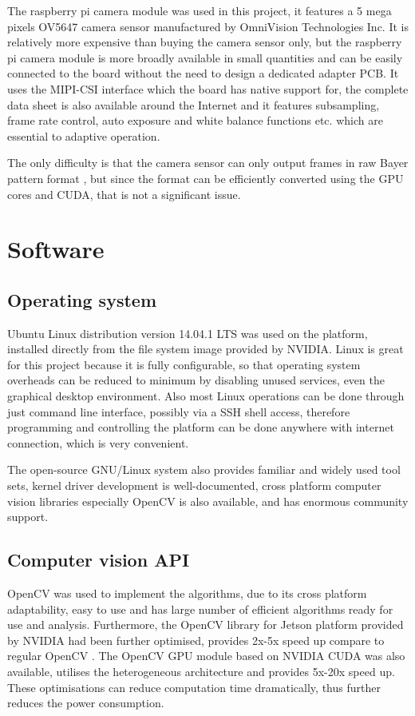 The raspberry pi camera module was used in this project, it features a 5 mega pixels OV5647 camera sensor manufactured by OmniVision Technologies Inc. It is relatively more expensive than buying the camera sensor only, but the raspberry pi camera module is more broadly available in small quantities and can be easily connected to the board without the need to design a dedicated adapter PCB. It uses the MIPI-CSI interface which the board has native support for, the complete data sheet is also available around the Internet and it features subsampling, frame rate control, auto exposure and white balance functions etc. which are essential to adaptive operation.

The only difficulty is that the camera sensor can only output frames in raw Bayer pattern format \cite{bayer1976color}, but since the format can be efficiently converted using the GPU cores and CUDA, that is not a significant issue.

\section{Software}

\subsection{Operating system}

Ubuntu Linux distribution version 14.04.1 LTS was used on the platform, installed directly from the file system image provided by NVIDIA. Linux is great for this project because it is fully configurable, so that operating system overheads can be reduced to minimum by disabling unused services, even the graphical desktop environment. Also most Linux operations can be done through just command line interface, possibly via a SSH shell access, therefore programming and controlling the platform can be done anywhere with internet connection, which is very convenient.

The open-source GNU/Linux system also provides familiar and widely used tool sets, kernel driver development is well-documented, cross platform computer vision libraries especially OpenCV is also available, and has enormous community support.

\subsection{Computer vision API}

OpenCV \cite{opencv} was used to implement the algorithms, due to its cross platform adaptability, easy to use and has large number of efficient algorithms ready for use and analysis. Furthermore, the OpenCV library for Jetson platform provided by NVIDIA had been further optimised, provides 2x-5x speed up compare to regular OpenCV \cite{NVIDIA:perf}. The OpenCV GPU module based on NVIDIA CUDA was also available, utilises the heterogeneous architecture and provides 5x-20x speed up. These optimisations can reduce computation time dramatically, thus further reduces the power consumption.

